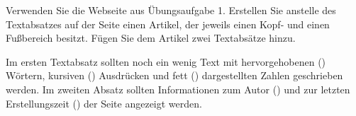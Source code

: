 %
\par Verwenden Sie die Webseite aus Übungsaufgabe 1. Erstellen Sie anstelle des
Textabsatzes auf der Seite einen Artikel, der jeweils einen Kopf- und einen
Fußbereich besitzt. Fügen Sie dem Artikel zwei Textabsätze hinzu.
%
\par Im ersten Textabsatz sollten noch ein wenig Text mit hervorgehobenen
() Wörtern, kursiven () Ausdrücken und fett ()
dargestellten Zahlen geschrieben werden. Im zweiten Absatz sollten
Informationen zum Autor () und zur letzten Erstellungszeit
() der Seite angezeigt werden.